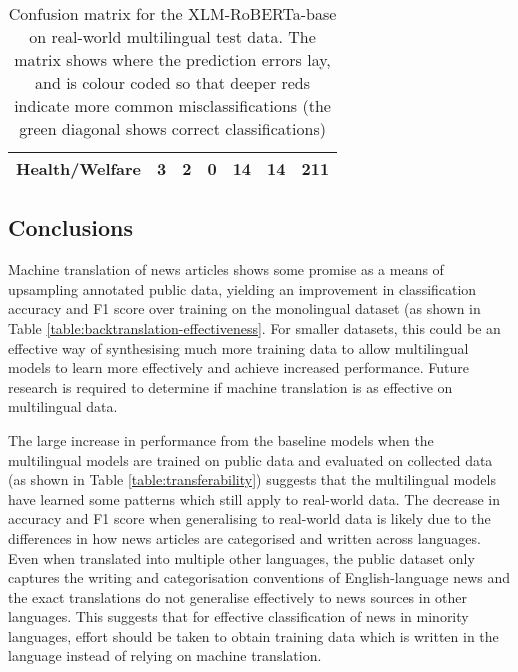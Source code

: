 \documentclass{l4proj}
\begin{document}
\begin{table}[]
\begin{tabular}{lllllll}
\textbf{Health/Welfare}                   & \cellcolor[HTML]{FFCCC9}3            & \cellcolor[HTML]{FFCCC9}2            & 0                                    & \cellcolor[HTML]{FD6864}14           & \cellcolor[HTML]{FD6864}14           & \cellcolor[HTML]{67FD9A}\textbf{211} \\ \hline
\end{tabular}
\caption{Confusion matrix for the XLM-RoBERTa-base on real-world multilingual test data. The matrix shows where the prediction errors lay, and is colour coded so that deeper reds indicate more common misclassifications (the green diagonal shows correct classifications)}
\label{table:confusion_matrix}
\end{table}

\subsection{Conclusions}
Machine translation of news articles shows some promise as a means of upsampling annotated public data, yielding an improvement in classification accuracy and F1 score over training on the monolingual dataset (as shown in Table \ref{table:backtranslation-effectiveness}. For smaller datasets, this could be an effective way of synthesising much more training data to allow multilingual models to learn more effectively and achieve increased performance. Future research is required to determine if machine translation is as effective on multilingual data. \par
The large increase in performance from the baseline models when the multilingual models are trained on public data and evaluated on collected data (as shown in Table \ref{table:transferability}) suggests that the multilingual models have learned some patterns which still apply to real-world data. The decrease in accuracy and F1 score when generalising to real-world data is likely due to the differences in how news articles are categorised and written across languages. Even when translated into multiple other languages, the public dataset only captures the writing and categorisation conventions of English-language news and the exact translations do not generalise effectively to news sources in other languages. This suggests that for effective classification of news in minority languages, effort should be taken to obtain training data which is written in the language instead of relying on machine translation. \par
\end{document}

